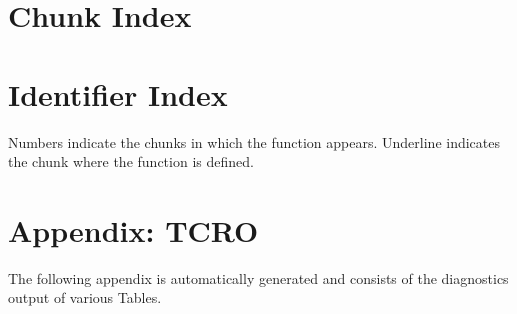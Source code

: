 \documentclass[a4paper]{article}
\begin{document}
\section{Chunk Index}
\label{sec:chunk-index}
\nowebchunks

\section{Identifier Index}
\label{sec:identifier-index}
Numbers indicate the chunks in which the function appears.
Underline indicates the chunk where the function is defined.
\medskip

\nowebindex

\nocite{*}



\section{Appendix: TCRO}
The following appendix is automatically generated and consists of the diagnostics output of various Tables.
\newpage
\end{document}
